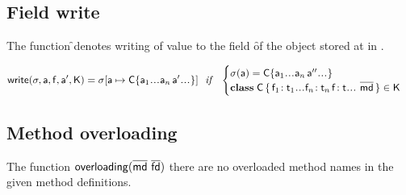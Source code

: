 \documentclass[acmlarge, anonymous, authordraft]{acmart}
\begin{document}
\subsection{Field write}

The function \setf\s\a\f\ap\K denotes writing of value \ap to the field \f of
the object stored at \a in \s.

\begin{equation*}
\setf \s\a\f\ap\K= \Map\s{\Bind{\a}{\obj\C{\a_1\dots\a_n\,\ap\dots}}}
  ~~\mathit{if}~~ \begin{cases}
   \s(\a) = \obj\C{\a_1\dots\a_n\,\app\dots}\\
   \Class\C{\Fdef{\f_1}{\t_1}\dots\Fdef{\f_n}{\t_n}\,\Fdef\f\t\dots}{\b\md}\in\K
\end{cases}
\end{equation*}

\subsection{Method overloading}

The function $\xt{overloading}(\b\md ~ \b\fd)$ there are no overloaded method names in the
given method definitions.


\begin{mathpar}




\end{mathpar}
\end{document}
